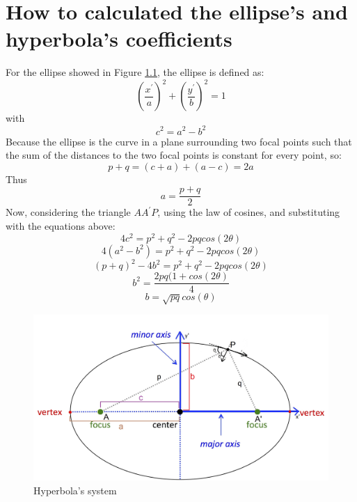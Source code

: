 %
%
\chapter{How to calculated the ellipse's and hyperbola's coefficients}
%
\label{cap:AppendixB}
%
%

\medskip
For the ellipse showed in Figure \ref{fig: System AppendixB}, the ellipse is defined as:
\begin{equation}
\left( \frac{x^{'}}{a} \right)^2 + \left( \frac{y^{'}}{b} \right)^2 = 1
\end{equation}
with
\begin{equation}
c^2 = a^2 - b^2
\end{equation}
Because the ellipse is the curve in a plane surrounding two focal points such that the sum of the distances to the two focal points is constant for every point, so:
\begin{equation}
p + q = (c + a) + (a - c) = 2 a
\end{equation}
Thus
\begin{equation}
a = \frac{p + q}{2}
\end{equation}
Now, considering the triangle $A A^{'} P $, using the law of cosines, and substituting with the equations above:
\begin{equation}
4 c^2 = p^2 + q^2 - 2 p q cos (2 \theta)
\end{equation}
\begin{equation}
4 (a^2 - b^2) = p^2 + q^2 - 2 p q cos ( 2 \theta)
\end{equation} 
\begin{equation}
(p + q)^2 - 4 b^2 = p^2 + q^2 - 2 p q cos (2 \theta)
\end{equation}
\begin{equation}
b^2 = \frac{2 p q (1 + cos (2 \theta)}{4}
\end{equation}
\begin{equation}
b = \sqrt{p q} cos (\theta)
\end{equation}
\begin{figure}[H]
%
\centering
%
\includegraphics[width=.6\textwidth]{Immagini/AppendixB/EllipseSystem3}
%
\caption{Hyperbola's system}
%
\label{fig: System AppendixB}
%
\end{figure}
